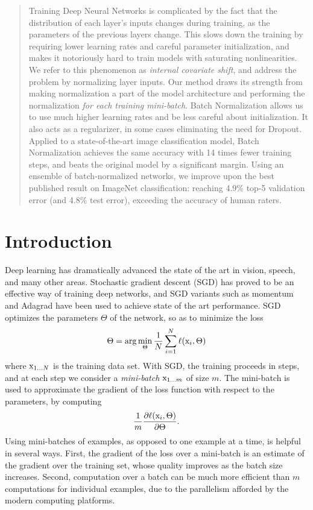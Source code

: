 \documentclass[twocolumn]{article}
\begin{document}
\begin{abstract}

Training Deep Neural Networks is complicated by the fact that the
distribution of each layer's inputs changes during training, as the
parameters of the previous layers change.  This slows down the
training by requiring lower learning rates and careful parameter
initialization, and makes it notoriously hard to train models with
saturating nonlinearities.  We refer to this phenomenon as {\em
  internal covariate shift}, and address the problem by normalizing
layer inputs.  Our method draws its strength from making normalization
a part of the model architecture and performing the normalization {\em
  for each training mini-batch}.  Batch Normalization allows us to use
much higher learning rates and be less careful about
initialization. It also acts as a regularizer, in some cases
eliminating the need for Dropout.  Applied to a state-of-the-art image
classification model, Batch Normalization achieves the same accuracy
with 14 times fewer training steps, and beats the original model by a
significant margin. 
Using an ensemble of batch-normalized networks, we
improve upon the best published result on ImageNet classification:
reaching 4.9\% top-5 validation error (and 4.8\% test error), exceeding the accuracy
of human raters.

\end{abstract}

\section{Introduction}


Deep learning has dramatically advanced the state of the art in vision, speech,
and many other areas. Stochastic gradient descent (SGD) has proved to be an effective way of training
deep networks, and SGD variants such as momentum \cite{momentum} and Adagrad \cite{adagrad} have been used to
achieve state of the art performance. SGD optimizes the parameters $\Theta$ of
the network, so as to minimize the loss $$\Theta = \arg \min_\Theta
\frac{1}{N}\sum_{i=1}^N \ell(\mathrm{x}_i, \Theta)$$ where
$\mathrm{x}_{1\ldots N}$ is the training data set.  With SGD, the training
proceeds in steps, and at each step we consider a {\em mini-batch}
$\mathrm{x}_{1\ldots m}$ of size $m$. The mini-batch is used
to approximate the gradient of the loss function with respect to the parameters,
by computing $$\frac{1}{m} \frac{\partial  \ell(\mathrm{x}_i, \Theta)}{\partial  \Theta}.$$ Using
mini-batches of examples, as opposed to one example at a time, is helpful in
several ways. First, the gradient of the loss over a mini-batch is an estimate
of the gradient over the training set, whose quality  improves
as the batch size increases. Second, computation over a batch can be much more
efficient than $m$ computations for individual examples, due to the parallelism
afforded by the modern computing platforms.
\end{document}
